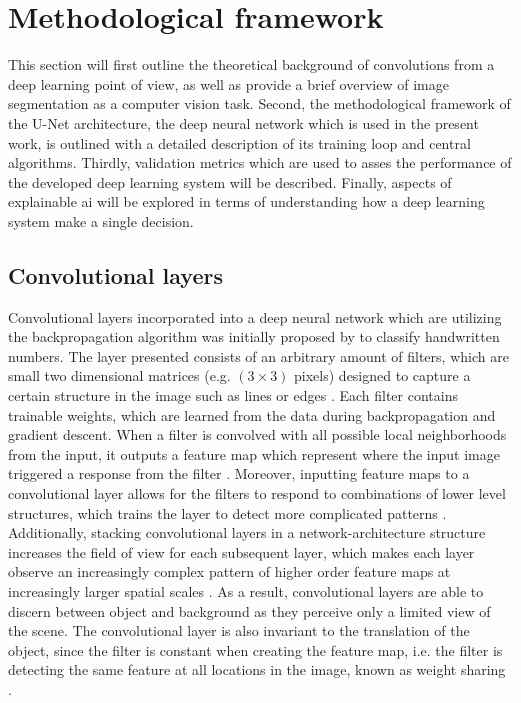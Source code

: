 \documentclass[../main/thesis.tex]{subfiles}
\begin{document}
\section{Methodological framework}
This section will first outline the theoretical background of convolutions from a deep learning point of view, as well as provide a brief overview of image segmentation as a computer vision task. Second, the methodological framework of the U-Net architecture, the deep neural network which is used in the present work, is outlined with a detailed description of its training loop and central algorithms. Thirdly, validation metrics which are used to asses the performance of the developed deep learning system will be described. Finally, aspects of explainable ai will be explored in terms of understanding how a deep learning system make a single decision. 

\subsection{Convolutional layers}
\label{sec:convolutional-layer}
Convolutional layers incorporated into a deep neural network which are utilizing the backpropagation algorithm \citep{Rumelhart1986} was initially proposed by \citet{LeCun1989} to classify handwritten numbers. The layer \citet{LeCun1989} presented consists of an arbitrary amount of filters, which are small two dimensional matrices (e.g. $(3 \times 3)$ pixels) designed to capture a certain structure in the image such as lines or edges . Each filter contains trainable weights, which are learned from the data during backpropagation \citep{LeCun1989} and gradient descent. When a filter is convolved with all possible local neighborhoods from the input, it outputs a feature map which represent where the input image triggered a response from the filter \citep{Zeiler2010}. Moreover, inputting feature maps to a convolutional layer allows for the filters to respond to combinations of lower level structures, which trains the layer to detect more complicated patterns \citep{Fukushima1980}. Additionally, stacking convolutional layers in a network-architecture structure increases the field of view for each subsequent layer, which makes each layer observe an increasingly complex pattern of higher order feature maps at increasingly larger spatial scales \citep{Fukushima1980}. As a result, convolutional layers are able to discern between object and background as they perceive only a limited view of the scene. The convolutional layer is also invariant to the translation of the object, since the filter is constant when creating the feature map, i.e. the filter is detecting the same feature at all locations in the image, known as weight sharing \citep{LeCun1989}.
\end{document}
